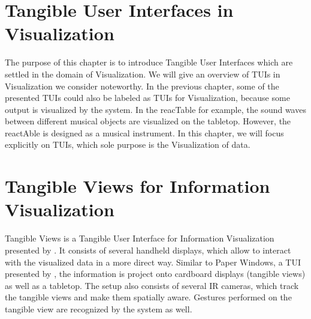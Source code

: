 \section{Tangible User Interfaces in Visualization}
The purpose of this chapter is to introduce Tangible User Interfaces which are settled in the domain of Visualization. We will give an overview of TUIs in Visualization we consider noteworthy. In the previous chapter, some of the presented TUIs could also be labeled as TUIs for Visualization, because some output is visualized by the system. In the reacTable for example, the sound waves between different musical objects are visualized on the tabletop. However, the reactAble is designed as a musical instrument. In this chapter, we will focus explicitly on TUIs, which sole purpose is the Visualization of data.

\section{Tangible Views for Information Visualization}
Tangible Views is a Tangible User Interface for Information Visualization presented by \cite{spindler10}. It consists of several handheld displays, which allow to interact with the visualized data in a more direct way. Similar to Paper Windows, a TUI presented by \cite{holman05}, the information is project onto cardboard displays (tangible views) as well as a tabletop. The setup also consists of several IR cameras, which track the tangible views and make them spatially aware. Gestures performed on the tangible view are recognized by the system as well. 
